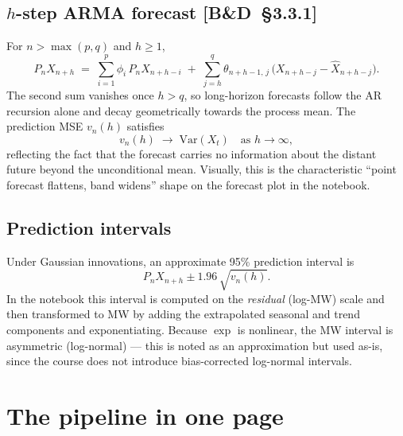 \documentclass[11pt,a4paper]{article}
\newcommand{\Var}{\mathrm{Var}}
\newcommand{\BD}[1]{\textsc{[B\&D~§#1]}}
\begin{document}
\subsection*{$h$-step ARMA forecast \BD{3.3.1}}
For $n > \max(p, q)$ and $h \geq 1$,
\begin{equation}
P_n X_{n+h}
\;=\;
\sum_{i=1}^{p} \phi_i\, P_n X_{n+h-i}
\;+\;
\sum_{j=h}^{q} \theta_{n+h-1,\, j}\,\bigl(X_{n+h-j} - \hat X_{n+h-j}\bigr).
\label{eq:hstep}
\end{equation}
The second sum vanishes once $h > q$, so long-horizon forecasts follow the AR
recursion alone and decay geometrically towards the process mean. The
prediction MSE $v_n(h)$ satisfies
$$v_n(h) \;\longrightarrow\; \Var(X_t) \quad \text{as } h \to \infty,$$
reflecting the fact that the forecast carries no information about the distant
future beyond the unconditional mean. Visually, this is the characteristic
``point forecast flattens, band widens'' shape on the forecast plot in the
notebook.

\subsection*{Prediction intervals}
Under Gaussian innovations, an approximate 95\% prediction interval is
\begin{equation}
P_n X_{n+h} \pm 1.96\,\sqrt{v_n(h)}.
\end{equation}
In the notebook this interval is computed on the \emph{residual} (log-MW) scale
and then transformed to MW by adding the extrapolated seasonal and trend
components and exponentiating. Because $\exp$ is nonlinear, the MW interval is
asymmetric (log-normal) --- this is noted as an approximation but used as-is,
since the course does not introduce bias-corrected log-normal intervals.

\section{The pipeline in one page}
\end{document}
